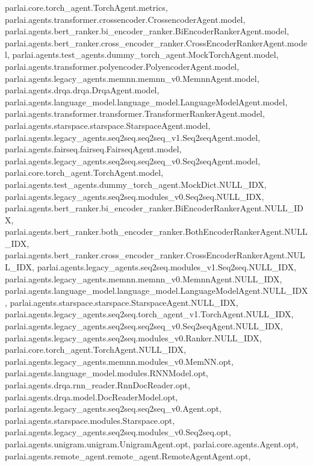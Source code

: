parlai.\+core.\+torch\+\_\+agent.\+Torch\+Agent.\+metrics, parlai.\+agents.\+transformer.\+crossencoder.\+Crossencoder\+Agent.\+model, parlai.\+agents.\+bert\+\_\+ranker.\+bi\+\_\+encoder\+\_\+ranker.\+Bi\+Encoder\+Ranker\+Agent.\+model, parlai.\+agents.\+bert\+\_\+ranker.\+cross\+\_\+encoder\+\_\+ranker.\+Cross\+Encoder\+Ranker\+Agent.\+model, parlai.\+agents.\+test\+\_\+agents.\+dummy\+\_\+torch\+\_\+agent.\+Mock\+Torch\+Agent.\+model, parlai.\+agents.\+transformer.\+polyencoder.\+Polyencoder\+Agent.\+model, parlai.\+agents.\+legacy\+\_\+agents.\+memnn.\+memnn\+\_\+v0.\+Memnn\+Agent.\+model, parlai.\+agents.\+drqa.\+drqa.\+Drqa\+Agent.\+model, parlai.\+agents.\+language\+\_\+model.\+language\+\_\+model.\+Language\+Model\+Agent.\+model, parlai.\+agents.\+transformer.\+transformer.\+Transformer\+Ranker\+Agent.\+model, parlai.\+agents.\+starspace.\+starspace.\+Starspace\+Agent.\+model, parlai.\+agents.\+legacy\+\_\+agents.\+seq2seq.\+seq2seq\+\_\+v1.\+Seq2seq\+Agent.\+model, parlai.\+agents.\+fairseq.\+fairseq.\+Fairseq\+Agent.\+model, parlai.\+agents.\+legacy\+\_\+agents.\+seq2seq.\+seq2seq\+\_\+v0.\+Seq2seq\+Agent.\+model, parlai.\+core.\+torch\+\_\+agent.\+Torch\+Agent.\+model, parlai.\+agents.\+test\+\_\+agents.\+dummy\+\_\+torch\+\_\+agent.\+Mock\+Dict.\+N\+U\+L\+L\+\_\+\+I\+DX, parlai.\+agents.\+legacy\+\_\+agents.\+seq2seq.\+modules\+\_\+v0.\+Seq2seq.\+N\+U\+L\+L\+\_\+\+I\+DX, parlai.\+agents.\+bert\+\_\+ranker.\+bi\+\_\+encoder\+\_\+ranker.\+Bi\+Encoder\+Ranker\+Agent.\+N\+U\+L\+L\+\_\+\+I\+DX, parlai.\+agents.\+bert\+\_\+ranker.\+both\+\_\+encoder\+\_\+ranker.\+Both\+Encoder\+Ranker\+Agent.\+N\+U\+L\+L\+\_\+\+I\+DX, parlai.\+agents.\+bert\+\_\+ranker.\+cross\+\_\+encoder\+\_\+ranker.\+Cross\+Encoder\+Ranker\+Agent.\+N\+U\+L\+L\+\_\+\+I\+DX, parlai.\+agents.\+legacy\+\_\+agents.\+seq2seq.\+modules\+\_\+v1.\+Seq2seq.\+N\+U\+L\+L\+\_\+\+I\+DX, parlai.\+agents.\+legacy\+\_\+agents.\+memnn.\+memnn\+\_\+v0.\+Memnn\+Agent.\+N\+U\+L\+L\+\_\+\+I\+DX, parlai.\+agents.\+language\+\_\+model.\+language\+\_\+model.\+Language\+Model\+Agent.\+N\+U\+L\+L\+\_\+\+I\+DX, parlai.\+agents.\+starspace.\+starspace.\+Starspace\+Agent.\+N\+U\+L\+L\+\_\+\+I\+DX, parlai.\+agents.\+legacy\+\_\+agents.\+seq2seq.\+torch\+\_\+agent\+\_\+v1.\+Torch\+Agent.\+N\+U\+L\+L\+\_\+\+I\+DX, parlai.\+agents.\+legacy\+\_\+agents.\+seq2seq.\+seq2seq\+\_\+v0.\+Seq2seq\+Agent.\+N\+U\+L\+L\+\_\+\+I\+DX, parlai.\+agents.\+legacy\+\_\+agents.\+seq2seq.\+modules\+\_\+v0.\+Ranker.\+N\+U\+L\+L\+\_\+\+I\+DX, parlai.\+core.\+torch\+\_\+agent.\+Torch\+Agent.\+N\+U\+L\+L\+\_\+\+I\+DX, parlai.\+agents.\+legacy\+\_\+agents.\+memnn.\+modules\+\_\+v0.\+Mem\+N\+N.\+opt, parlai.\+agents.\+language\+\_\+model.\+modules.\+R\+N\+N\+Model.\+opt, parlai.\+agents.\+drqa.\+rnn\+\_\+reader.\+Rnn\+Doc\+Reader.\+opt, parlai.\+agents.\+drqa.\+model.\+Doc\+Reader\+Model.\+opt, parlai.\+agents.\+legacy\+\_\+agents.\+seq2seq.\+seq2seq\+\_\+v0.\+Agent.\+opt, parlai.\+agents.\+starspace.\+modules.\+Starspace.\+opt, parlai.\+agents.\+legacy\+\_\+agents.\+seq2seq.\+modules\+\_\+v0.\+Seq2seq.\+opt, parlai.\+agents.\+unigram.\+unigram.\+Unigram\+Agent.\+opt, parlai.\+core.\+agents.\+Agent.\+opt, parlai.\+agents.\+remote\+\_\+agent.\+remote\+\_\+agent.\+Remote\+Agent\+Agent.\+opt, 